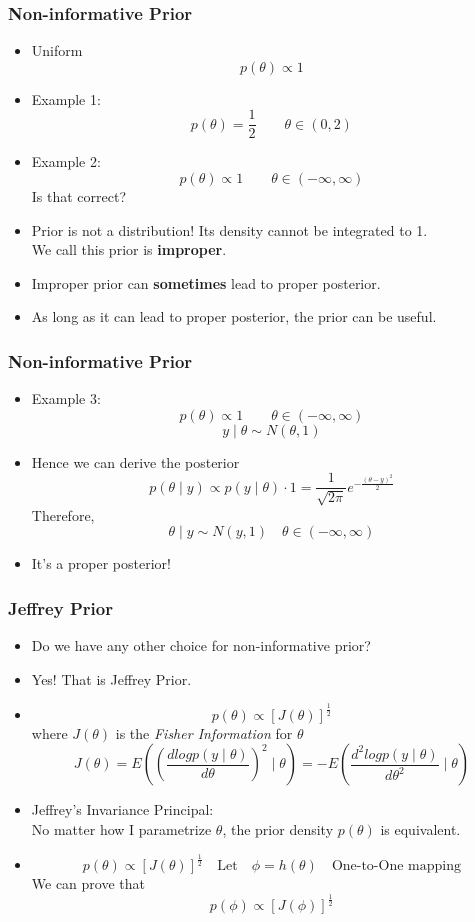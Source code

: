 \documentclass{beamer}
\begin{document}
\begin{frame}
\frametitle{Non-informative Prior}
\begin{itemize}
\item Uniform $$p(\theta) \propto 1$$
\item Example 1: $$p(\theta) = \frac{1}{2} \quad \quad \theta \in (0,2) $$
\item Example 2: $$p(\theta) \propto 1 \quad \quad \theta \in (-\infty,\infty) $$
Is that correct?
\item Prior is not a distribution! Its density cannot be integrated to 1.\\
We call this prior is {\bf improper}.
\item Improper prior can {\bf sometimes} lead to proper posterior.
\item As long as it can lead to proper posterior, the prior can be useful.
\end{itemize}
\end{frame}

\begin{frame}
\frametitle{Non-informative Prior}
\begin{itemize}
\item Example 3: $$p(\theta) \propto 1 \quad \quad \theta \in (-\infty,\infty) $$
$$y\mid \theta \sim N(\theta, 1)$$
\item Hence we can derive the posterior $$p(\theta\mid y) \propto p(y\mid \theta)\cdot 1 = \frac{1}{\sqrt{2\pi}}e^{-\frac{(\theta - y)^2}{2}}$$
Therefore, $$\theta \mid y \sim N(y,1) \quad \theta \in (-\infty,\infty) $$ 
\item It's a proper posterior!
\end{itemize}
\end{frame}

\begin{frame}
\frametitle{Jeffrey Prior}
\begin{itemize}
\item Do we have any other choice for non-informative prior?\\
\item Yes! That is Jeffrey Prior.
\item $$p(\theta) \propto [J(\theta)]^{\frac{1}{2}}$$ where $J(\theta)$ is the {\em Fisher Information} for $\theta$
$$J(\theta) = E((\frac{d logp(y\mid \theta)}{d\theta})^2\mid \theta)= - E(\frac{d^{2} logp(y\mid \theta)}{d\theta^{2}}\mid \theta)$$
\item Jeffrey's Invariance Principal:\\
No matter how I parametrize $\theta$, the prior density $p(\theta)$ is equivalent.
\item  $$p(\theta) \propto [J(\theta)]^{\frac{1}{2}} \quad \text{Let} \quad \phi = h(\theta) \quad \text{One-to-One mapping}$$ We can prove that $$p(\phi) \propto [J(\phi)]^{\frac{1}{2}}$$ 
\end{itemize}
\end{frame}
\end{document}
